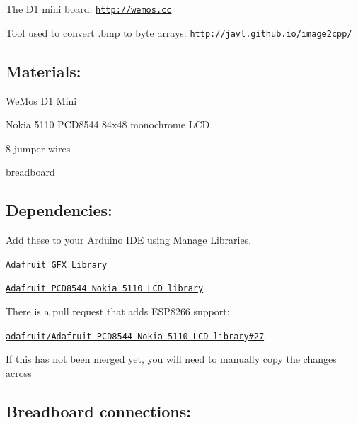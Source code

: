 The D1 mini board\+: \href{http://wemos.cc}{\tt http\+://wemos.\+cc}

Tool used to convert .bmp to byte arrays\+: \href{http://javl.github.io/image2cpp/}{\tt http\+://javl.\+github.\+io/image2cpp/}

\subsection*{Materials\+:}


\begin{DoxyItemize}
\item We\+Mos D1 Mini
\item Nokia 5110 P\+C\+D8544 84x48 monochrome L\+CD
\item 8 jumper wires
\item breadboard
\end{DoxyItemize}

\subsection*{Dependencies\+:}

Add these to your Arduino I\+DE using Manage Libraries.


\begin{DoxyItemize}
\item \href{https://github.com/adafruit/Adafruit-GFX-Library}{\tt Adafruit G\+FX Library}
\item \href{https://github.com/adafruit/Adafruit-PCD8544-Nokia-5110-LCD-library}{\tt Adafruit P\+C\+D8544 Nokia 5110 L\+CD library}
\begin{DoxyItemize}
\item There is a pull request that adds E\+S\+P8266 support\+:
\item \href{https://github.com/adafruit/Adafruit-PCD8544-Nokia-5110-LCD-library/pull/27}{\tt adafruit/\+Adafruit-\/\+P\+C\+D8544-\/\+Nokia-\/5110-\/\+L\+C\+D-\/library\#27}
\item If this has not been merged yet, you will need to manually copy the changes across
\end{DoxyItemize}
\end{DoxyItemize}

\subsection*{Breadboard connections\+:}

